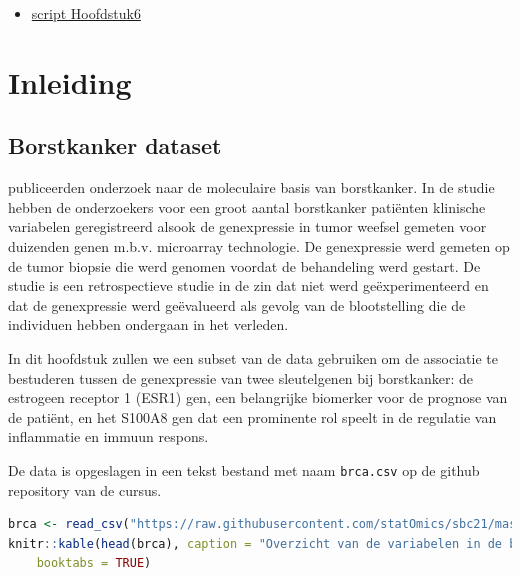 \documentclass[
  12pt,dutch,coursenotes]{book}
\newcommand{\passthrough}[1]{#1}
\providecommand{\tightlist}{%
  \setlength{\itemsep}{0pt}\setlength{\parskip}{0pt}}
\begin{document}
\begin{itemize}
\tightlist
\item
  \href{https://statomics.github.io/sbc21/rmd/06-linearRegression.html}{script Hoofdstuk6}
\end{itemize}

\hypertarget{inleiding-5}{%
\section{Inleiding}\label{inleiding-5}}

\hypertarget{borstkanker-dataset}{%
\subsection{Borstkanker dataset}\label{borstkanker-dataset}}

\citet{sotiriou2006} publiceerden onderzoek naar de moleculaire basis van borstkanker.
In de studie hebben de onderzoekers voor een groot aantal borstkanker patiënten klinische variabelen geregistreerd alsook de genexpressie in tumor weefsel gemeten voor duizenden genen m.b.v. microarray technologie.
De genexpressie werd gemeten op de tumor biopsie die werd genomen voordat de behandeling werd gestart.
De studie is een retrospectieve studie in de zin dat niet werd geëxperimenteerd en dat de genexpressie werd geëvalueerd als gevolg van de blootstelling die de individuen hebben ondergaan in het verleden.

In dit hoofdstuk zullen we een subset van de data gebruiken om de associatie te bestuderen tussen de genexpressie van twee sleutelgenen bij borstkanker: de estrogeen receptor 1 (ESR1) gen, een belangrijke biomerker voor de prognose van de patiënt, en het S100A8 gen dat een prominente rol speelt in de regulatie van inflammatie en immuun respons.

De data is opgeslagen in een tekst bestand met naam \passthrough{\lstinline!brca.csv!} op de github repository van de cursus.

\begin{lstlisting}[language=R]
brca <- read_csv("https://raw.githubusercontent.com/statOmics/sbc21/master/data/breastcancer.csv")
knitr::kable(head(brca), caption = "Overzicht van de variabelen in de borstkanker dataset.",
    booktabs = TRUE)
\end{lstlisting}
\end{document}
